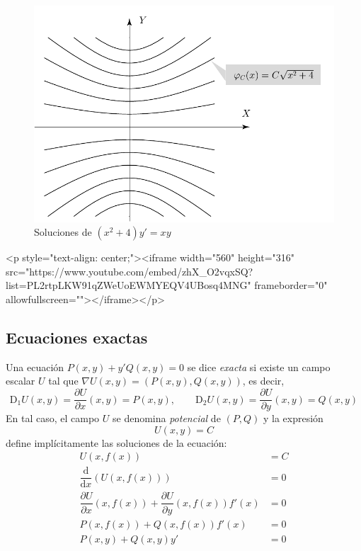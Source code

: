 \begin{latexonly}
\begin{figure}
\begin{center}
\includegraphics[width=.8\textwidth]{T3/figs/ejem2.pdf}
\end{center}
\caption{Soluciones de $(x^2+4)y' = xy$}\label{ej2}
\end{figure}
\end{latexonly}

\begin{rawhtml}
<p style="text-align: center;"><iframe width="560" height="316" src="https://www.youtube.com/embed/zhX_O2vqxSQ?list=PL2rtpLKW91qZWeUoEWMYEQV4UBosq4MNG" frameborder="0" allowfullscreen=""></iframe></p>
\end{rawhtml}


\subsection{Ecuaciones exactas}

Una ecuación $P(x,y)+y'Q(x,y)=0$ se dice \emph{exacta} si existe un campo escalar $U$ tal que $\nabla U(x,y)=(P(x,y),Q(x,y))$, es decir,
\[
\mathrm D_1U(x,y)=\dfrac{\partial U}{\partial x}(x,y)=P(x,y),\qquad
\mathrm D_2U(x,y)=\dfrac{\partial U}{\partial y}(x,y)=Q(x,y)
\]
En tal caso, el campo $U$ se denomina \emph{potencial} de $(P,Q)$ y la expresión
\[
U(x,y)=C
\]
define implícitamente las soluciones de la ecuación:
\begin{align*}
U(x,f(x))&=C\\
\dfrac{\mathrm d}{\mathrm dx}(U(x,f(x)))&=0\\
\dfrac{\partial U}{\partial x}(x,f(x))+\dfrac{\partial U}{\partial y}(x,f(x))f'(x)&=0\\
P(x,f(x))+Q(x,f(x))f'(x)&=0 \\
P(x,y)+Q(x,y)y'&=0 
\end{align*}

